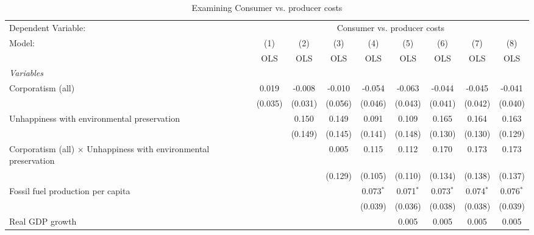 
\begin{table}[htbp]
   \caption{Examining Consumer vs. producer costs}
   \centering
   \begin{tabular}{lcccccccc}
      \toprule
      Dependent Variable: & \multicolumn{8}{c}{Consumer vs. producer costs}\\
      Model:                                                                  & (1)     & (2)     & (3)     & (4)         & (5)         & (6)         & (7)         & (8)\\  
                                                                              &  OLS    & OLS     & OLS     & OLS         & OLS         & OLS         & OLS         & OLS\\  
      \midrule
      \emph{Variables}\\
      Corporatism (all)                                                       & 0.019   & -0.008  & -0.010  & -0.054      & -0.063      & -0.044      & -0.045      & -0.041\\   
                                                                              & (0.035) & (0.031) & (0.056) & (0.046)     & (0.043)     & (0.041)     & (0.042)     & (0.040)\\   
      Unhappiness with environmental preservation                             &         & 0.150   & 0.149   & 0.091       & 0.109       & 0.165       & 0.164       & 0.163\\   
                                                                              &         & (0.149) & (0.145) & (0.141)     & (0.148)     & (0.130)     & (0.130)     & (0.129)\\   
      Corporatism (all) $\times$ Unhappiness with environmental preservation  &         &         & 0.005   & 0.115       & 0.112       & 0.170       & 0.173       & 0.173\\   
                                                                              &         &         & (0.129) & (0.105)     & (0.110)     & (0.134)     & (0.138)     & (0.137)\\   
      Fossil fuel production per capita                                       &         &         &         & 0.073$^{*}$ & 0.071$^{*}$ & 0.073$^{*}$ & 0.074$^{*}$ & 0.076$^{*}$\\   
                                                                              &         &         &         & (0.039)     & (0.036)     & (0.038)     & (0.038)     & (0.039)\\   
      Real GDP growth                                                         &         &         &         &             & 0.005       & 0.005       & 0.005       & 0.005\\   

\end{tabular}
\end{table}
